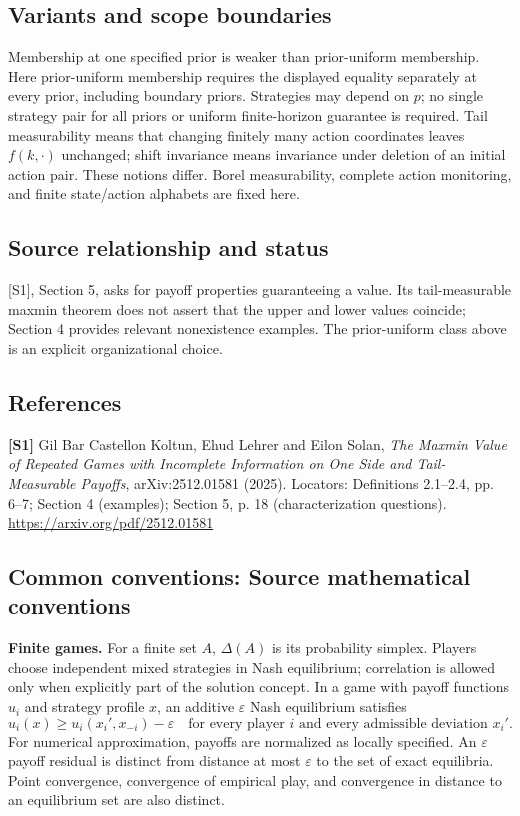 \documentclass[11pt,a4paper]{article}
\begin{document}
\subsection*{Variants and scope boundaries}
Membership at one specified prior is weaker than prior-uniform membership. Here prior-uniform membership requires the displayed equality separately at every prior, including boundary priors. Strategies may depend on $p$; no single strategy pair for all priors or uniform finite-horizon guarantee is required. Tail measurability means that changing finitely many action coordinates leaves $f(k,\cdot)$ unchanged; shift invariance means invariance under deletion of an initial action pair. These notions differ. Borel measurability, complete action monitoring, and finite state/action alphabets are fixed here.
\subsection*{Source relationship and status}
[S1], Section 5, asks for payoff properties guaranteeing a value. Its tail-measurable maxmin theorem does not assert that the upper and lower values coincide; Section 4 provides relevant nonexistence examples. The prior-uniform class above is an explicit organizational choice.
\subsection*{References}
\begingroup\footnotesize\raggedright
\textbf{[S1]} Gil Bar Castellon Koltun, Ehud Lehrer and Eilon Solan, \emph{The Maxmin Value of Repeated Games with Incomplete Information on One Side and Tail-Measurable Payoffs}, arXiv:2512.01581 (2025). Locators: Definitions 2.1--2.4, pp. 6--7; Section 4 (examples); Section 5, p. 18 (characterization questions). \url{https://arxiv.org/pdf/2512.01581}
\par\endgroup

\subsection*{Common conventions: Source mathematical conventions}

\textbf{Finite games.} For a finite set $A$, $\Delta(A)$ is its probability
simplex. Players choose independent mixed strategies in Nash equilibrium;
correlation is allowed only when explicitly part of the solution concept.
In a game with payoff functions $u_i$ and strategy profile $x$, an additive
$\varepsilon$ Nash equilibrium satisfies
\[
 u_i(x)\geq u_i(x_i',x_{-i})-\varepsilon
 \quad\text{for every player $i$ and every admissible deviation $x_i'$}.
\]
For numerical approximation, payoffs are normalized as locally specified.
An $\varepsilon$ payoff residual is distinct from distance at most
$\varepsilon$ to the set of exact equilibria. Point convergence, convergence
of empirical play, and convergence in distance to an equilibrium set are
also distinct.
\end{document}
